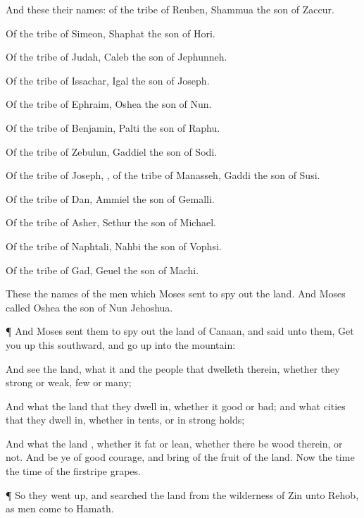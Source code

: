 {And these
{} their
names: of the
tribe of
Reuben,
Shammua the
son of
Zaccur.

Of the
tribe of
Simeon,
Shaphat the
son of
Hori.

Of the
tribe of
Judah,
Caleb the
son of
Jephunneh.

Of the
tribe of
Issachar,
Igal the
son of
Joseph.

Of the
tribe of
Ephraim,
Oshea the
son of
Nun.

Of the
tribe of
Benjamin,
Palti the
son of
Raphu.

Of the
tribe of
Zebulun,
Gaddiel the
son of
Sodi.

Of the
tribe of
Joseph,
{}, of the
tribe of
Manasseh,
Gaddi the
son of
Susi.

Of the
tribe of
Dan,
Ammiel the
son of
Gemalli.

Of the
tribe of
Asher,
Sethur the
son of
Michael.

Of the
tribe of
Naphtali,
Nahbi the
son of
Vophsi.

Of the
tribe of
Gad,
Geuel the
son of
Machi.

These
{} the
names of the
men which
Moses
sent to spy
out the
land. And
Moses
called
Oshea the
son of
Nun
Jehoshua.


\par }{\PP {}¶ And
Moses
sent them to spy
out the
land of
Canaan, and
said unto them, Get you
up this
{}
southward, and go
up into the
mountain:

And
see the
land, what it
{} and the
people that
dwelleth therein, whether they
{}
strong or
weak,
few or
many;

And what the
land
{} that they dwell
in, whether it
{}
good or
bad; and what
cities
{} that they
dwell
in, whether in
tents, or in strong
holds;

And what the
land
{}, whether it
{}
fat or
lean, whether there
be
wood therein, or not. And be ye of good
courage, and
bring of the
fruit of the
land. Now the
time
{} the
time of the
firstripe
grapes.


\par }{\PP {}¶ So they went
up, and
searched the
land from the
wilderness of
Zin unto
Rehob, as men
come to
Hamath.

}
